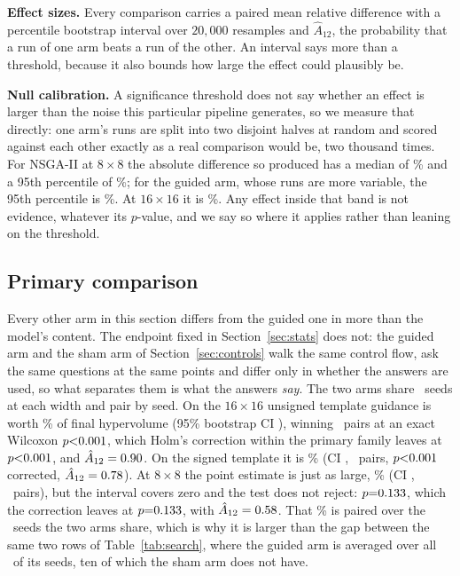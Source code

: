 \documentclass[acmsmall,review,anonymous]{acmart}
\begin{document}
\textbf{Effect sizes.}  Every comparison carries a paired mean relative
difference with a percentile bootstrap interval over $20{,}000$ resamples and
$\hat{A}_{12}$, the probability that a run of one arm beats a run of the other.
An interval says more than a threshold, because it also bounds how large the
effect could plausibly be.

\textbf{Null calibration.}  A significance threshold does
not say whether an effect is larger than the noise this particular pipeline
generates, so we measure that directly: one arm's runs are split into two
disjoint halves at random and scored against each other exactly as a real
comparison would be, two thousand times.  For NSGA-II at $8\times8$ the
absolute difference so produced has a median of \NullEightMed\% and a 95th
percentile of \NullEightN\%; for the guided arm, whose runs are more variable,
the 95th percentile is \NullEight\%.  At $16\times16$ it is \NullSixteen\%.
Any effect inside that band is not evidence, whatever its $p$-value, and we
say so where it applies rather than leaning on the threshold.

\subsection{Primary comparison}
\label{sec:primary}
Every other arm in this section differs from the guided one in more than the
model's content.  The endpoint fixed in Section~\ref{sec:stats} does not: the
guided arm and the sham arm of Section~\ref{sec:controls} walk the same control
flow, ask the same questions at the same points and differ only in whether the
answers are used, so what separates them is what the answers \emph{say}.  The
two arms share \ShamSixteenUN\ seeds at each width and pair by seed.  On the
$16\times16$ unsigned template guidance is worth \ShamSixteenU\% of final
hypervolume (95\% bootstrap CI \ShamSixteenUCI), winning \ShamSixteenUWins\
pairs at an exact Wilcoxon $p{<}0.001$, which Holm's correction within
the primary family leaves at $p{<}0.001$, and
$\hat{A}_{12}=0.90$.  On the signed template it is \ShamSixteenS\%
(CI \ShamSixteenSCI, \ShamSixteenSWins\ pairs, $p{<}0.001$
corrected, $\hat{A}_{12}=0.78$).  At $8\times8$ the point estimate is
just as large, \ShamEight\% (CI \ShamEightCI, \ShamEightWins\ pairs), but the
interval covers zero and the test does not reject: $p{=}0.133$, which the
correction leaves at $p{=}0.133$, with $\hat{A}_{12}=0.58$.  That
\ShamEight\% is paired over the \ShamEightN\ seeds the two arms share, which is
why it is larger than the gap between the same two rows of
Table~\ref{tab:search}, where the guided arm is averaged over all
\SeedsEight\ of its seeds, ten of which the sham arm does not have.
\end{document}
